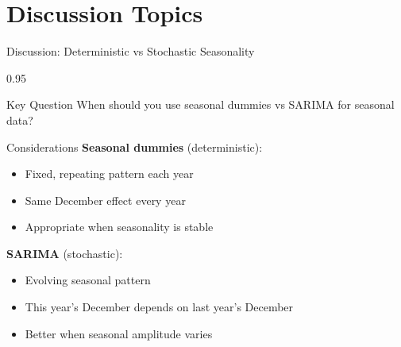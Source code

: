 \documentclass[9pt, aspectratio=169, t]{beamer}
\begin{document}
\section{Discussion Topics}

\begin{frame}{Discussion: Deterministic vs Stochastic Seasonality}
    \begin{cminipage}{0.95\textwidth}
    \begin{block}{Key Question}
        When should you use seasonal dummies vs SARIMA for seasonal data?
    \end{block}

    \vspace{0.2cm}

    \begin{block}{Considerations}
        \textbf{Seasonal dummies} (deterministic):
        \begin{itemize}\setlength{\itemsep}{0pt}
            \item Fixed, repeating pattern each year
            \item Same December effect every year
            \item Appropriate when seasonality is stable
        \end{itemize}

        \vspace{0.2cm}
        \textbf{SARIMA} (stochastic):
        \begin{itemize}\setlength{\itemsep}{0pt}
            \item Evolving seasonal pattern
            \item This year's December depends on last year's December
            \item Better when seasonal amplitude varies
        \end{itemize}
    \end{block}
    \end{cminipage}
\end{frame}
\end{document}
